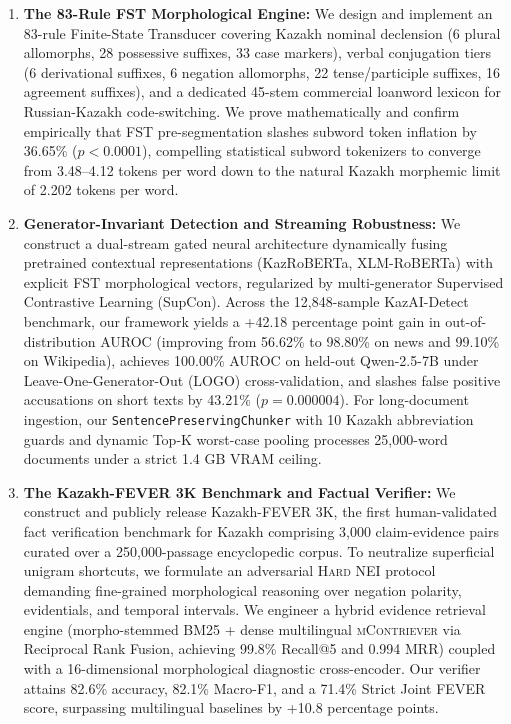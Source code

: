 \begin{enumerate}
    \item \textbf{The 83-Rule FST Morphological Engine:} We design and implement an 83-rule Finite-State Transducer covering Kazakh nominal declension (6 plural allomorphs, 28 possessive suffixes, 33 case markers), verbal conjugation tiers (6 derivational suffixes, 6 negation allomorphs, 22 tense/participle suffixes, 16 agreement suffixes), and a dedicated 45-stem commercial loanword lexicon for Russian-Kazakh code-switching. We prove mathematically and confirm empirically that FST pre-segmentation slashes subword token inflation by 36.65\% ($p < 0.0001$), compelling statistical subword tokenizers to converge from 3.48--4.12 tokens per word down to the natural Kazakh morphemic limit of 2.202 tokens per word.
    
    \item \textbf{Generator-Invariant Detection and Streaming Robustness:} We construct a dual-stream gated neural architecture dynamically fusing pretrained contextual representations (KazRoBERTa, XLM-RoBERTa) with explicit FST morphological vectors, regularized by multi-generator Supervised Contrastive Learning (SupCon). Across the 12,848-sample KazAI-Detect benchmark, our framework yields a +42.18 percentage point gain in out-of-distribution AUROC (improving from 56.62\% to 98.80\% on news and 99.10\% on Wikipedia), achieves 100.00\% AUROC on held-out Qwen-2.5-7B under Leave-One-Generator-Out (LOGO) cross-validation, and slashes false positive accusations on short texts by 43.21\% ($p = 0.000004$). For long-document ingestion, our \texttt{SentencePreservingChunker} with 10 Kazakh abbreviation guards and dynamic Top-K worst-case pooling processes 25,000-word documents under a strict 1.4 GB VRAM ceiling.
    
    \item \textbf{The Kazakh-FEVER 3K Benchmark and Factual Verifier:} We construct and publicly release Kazakh-FEVER 3K, the first human-validated fact verification benchmark for Kazakh comprising 3,000 claim-evidence pairs curated over a 250,000-passage encyclopedic corpus. To neutralize superficial unigram shortcuts, we formulate an adversarial \textsc{Hard NEI} protocol demanding fine-grained morphological reasoning over negation polarity, evidentials, and temporal intervals. We engineer a hybrid evidence retrieval engine (morpho-stemmed BM25 + dense multilingual \textsc{mContriever} via Reciprocal Rank Fusion, achieving 99.8\% Recall@5 and 0.994 MRR) coupled with a 16-dimensional morphological diagnostic cross-encoder. Our verifier attains 82.6\% accuracy, 82.1\% Macro-F1, and a 71.4\% Strict Joint FEVER score, surpassing multilingual baselines by +10.8 percentage points.
    

\end{enumerate}
